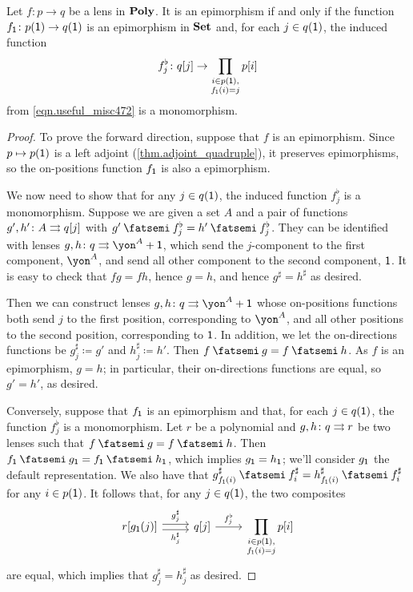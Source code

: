 \documentclass[Book-Poly]{subfiles}
\begin{document}
\begin{proposition}\label{prop.epis_in_poly}
Let $f \colon p \to q$ be a lens in $\mathbf{Poly}$. It is an epimorphism if and only if the function $f_{\textsf{1}} \colon p(\textsf{1}) \to q(\textsf{1})$ is an epimorphism in $\mathbf{Set}$ and, for each $j\in q(\textsf{1})$, the induced function
\[
    f^\flat_j \colon q[j] \to \prod_{\substack{i\in p(\textsf{1}), \\ f_{\textsf{1}}(i)=j}} p[i]
\]
from \eqref{eqn.useful_misc472} is a monomorphism.
\end{proposition}
\begin{proof}
To prove the forward direction, suppose that $f$ is an epimorphism. Since $p \mapsto p(\textsf{1})$ is a left adjoint (\cref{thm.adjoint_quadruple}), it preserves epimorphisms, so the on-positions function $f_{\textsf{1}}$ is also a epimorphism.

We now need to show that for any $j\in q(\textsf{1})$, the induced function $f^\flat_j$ is a monomorphism.
Suppose we are given a set $A$ and a pair of functions $g',h'\colon A\rightrightarrows q[j]$ with $g' \then f^\flat_j = h' \then f^\flat_j$.
They can be identified with lenses $g,h\colon q\tto \yon^A+\1$, which send the $j$-component to the first component, $\yon^A$, and send all other component to the second component, $\textsf{1}$. It is easy to check that $fg=fh$, hence $g=h$, and hence $g^\sharp=h^\sharp$ as desired.

Then we can construct lenses $g,h \colon q \tto \yon^A+\1$ whose on-positions functions both send $j$ to the first position, corresponding to $\yon^A$, and all other positions to the second position, corresponding to $\textsf{1}$.
In addition, we let the on-directions functions be $g^\sharp_j \coloneqq g'$ and $h^\sharp_j \coloneqq h'$.
Then $f \then g = f \then h$.
As $f$ is an epimorphism, $g = h$; in particular, their on-directions functions are equal, so $g' = h'$, as desired.

Conversely, suppose that $f_{\textsf{1}}$ is an epimorphism and that, for each $j\in q(\textsf{1})$, the function $f^\flat_j$ is a monomorphism. 
Let $r$ be a polynomial and $g,h\colon q\rightrightarrows r$ be two lenses such that $f \then g = f \then h$.
Then $f_\1 \then g_\1 = f_\1 \then h_\1$, which implies $g_{\textsf{1}}=h_{\textsf{1}}$; we'll consider $g_{\textsf{1}}$ the default representation.
We also have that $g^\sharp_{f_\1(i)} \then f^\sharp_i = h^\sharp_{f_\1(i)} \then f^\sharp_i$ for any $i\in p(\textsf{1})$.
It follows that, for any $j \in q(\textsf{1})$, the two composites
\[
\begin{tikzcd}
	r[g_\1(j)] \ar[r, shift left, "g^\sharp_j"] \ar[r, shift right, "h^\sharp_j"'] & q[j] \ar[r, "f^\flat_j"] & \displaystyle\prod_{\substack{i\in p(\1), \\ f_\1(i)=j}} p[i]
\end{tikzcd}
\]
are equal, which implies that $g^\sharp_j=h^\sharp_j$ as desired.
\end{proof}
\end{document}

